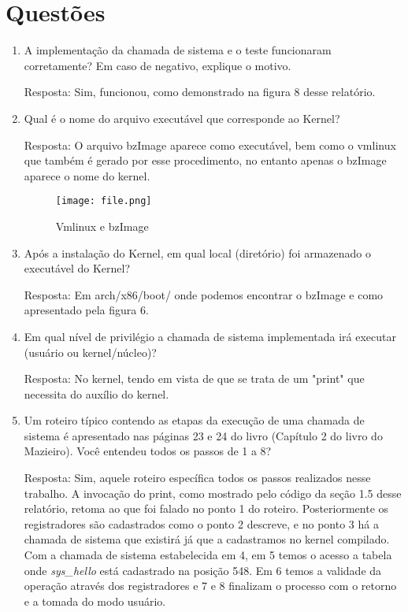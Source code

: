 \documentclass[a4paper, 12pt]{article}
\begin{document}
\section{Questões}
\begin{enumerate}
		\item A implementação da chamada de sistema e o teste funcionaram corretamente? Em caso de negativo, explique o motivo.
		
		Resposta: Sim, funcionou, como demonstrado na figura 8 desse relatório.
		
		\item Qual é o nome do arquivo executável que corresponde ao Kernel?
		
		Resposta: O arquivo bzImage aparece como executável, bem como o vmlinux que também é gerado por esse procedimento, no entanto apenas o bzImage aparece o nome do kernel.
		
		\begin{figure}[!h]
            \centering 
            \texttt{[image: file.png]}
            \label{figura:qualquernome}
            \caption{Vmlinux e bzImage}
        \end{figure}
        		
        \newpage
        
		\item Após a instalação do Kernel, em qual local (diretório) foi armazenado o executável do Kernel?
		
		Resposta: Em arch/x86/boot/ onde podemos encontrar o bzImage e como apresentado pela figura 6.
		
		\item Em qual nível de privilégio a chamada de sistema implementada irá executar (usuário ou kernel/núcleo)?
		
		Resposta: No kernel, tendo em vista de que se trata de um "print" que necessita do auxílio do kernel.
		
		\item Um roteiro típico contendo as etapas da execução de uma chamada de sistema é apresentado nas páginas 23 e 24 do livro (Capítulo 2 do livro do Mazieiro). Você entendeu todos os passos de 1 a 8?
		
		Resposta: Sim, aquele roteiro específica todos os passos realizados nesse trabalho. A invocação do print, como mostrado pelo código da seção 1.5 desse relatório, retoma ao que foi falado no ponto 1 do roteiro. Posteriormente os registradores são cadastrados como o ponto 2 descreve, e no ponto 3 há a chamada de sistema que existirá já que a cadastramos no kernel compilado. Com a chamada de sistema estabelecida em 4, em 5 temos o acesso a tabela onde \textit{sys\_hello} está cadastrado na posição 548. Em 6 temos a validade da operação através dos registradores e 7 e 8 finalizam o processo com o retorno e a tomada do modo usuário.
		

\end{enumerate}
\end{document}
